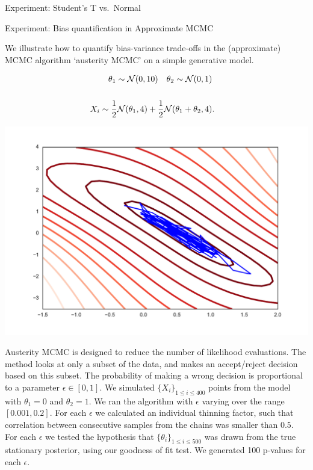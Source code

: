 \begin{frame}
\begin{columns}
\begin{column}{.32\linewidth}
\begin{block}{Experiment: Student's T vs.\ Normal}
\end{block}
\vspace{-0.75cm}


\begin{block}{Experiment: Bias quantification in Approximate MCMC}

 We  illustrate how to quantify bias-variance trade-offs in the (approximate) MCMC algorithm `austerity MCMC' \cite{korattikara2013austerity} on a simple generative model.

\begin{minipage}{.45\linewidth}
\begin{align*}
\theta_{1}\sim{\cal N}(0,10)\quad\theta_{2}\sim{\cal N}(0,1)\\\\
X_{i}\sim\frac{1}{2}{\cal N}(\theta_{1},4)+\frac{1}{2}{\cal N}(\theta_{1}+\theta_{2},4) & .
\end{align*}
\end{minipage}
\begin{minipage}{.45\linewidth}
\includegraphics[width=\textwidth]{../../presentation/img/sgld_trace_and_density.pdf}
\end{minipage}


\footnotesize
Austerity MCMC is designed to reduce the number
of likelihood evaluations. The method looks at only a subset of the data,
and makes an accept/reject decision based on this subset. The
probability of making a wrong decision is proportional to a parameter
$\epsilon\in[0,1]$. We simulated $\{X_{i}\}_{1\leq i\leq400}$ points from the model
with $\theta_{1}=0$ and $\theta_{2}=1$. We ran the algorithm with $\epsilon$ varying
over the range $[0.001,0.2]$. For each $\epsilon$ we calculated an
individual thinning factor, such that correlation between consecutive
 samples from the chains was smaller than $0.5$. For each $\epsilon$ we tested the
hypothesis that $\{\theta_{i}\}_{1\leq i\leq500}$ was drawn from the
true stationary posterior, using our goodness of fit test. We generated
100 p-values for each $\epsilon$.



\end{block}
\end{column}
\end{columns}
\end{frame}
